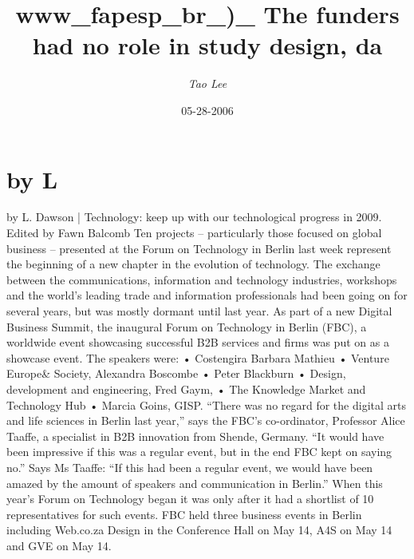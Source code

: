 \documentclass{article}%
\title{www\_fapesp\_br\_)\_ The funders had no role in study design, da}%
\author{\textit{Tao Lee}}%
\date{05-28-2006}%
\begin{document}
%
\normalsize%
\maketitle%
\section{by L}%
\label{sec:byL}%
by L. Dawson | Technology: keep up with our technological progress in 2009. Edited by Fawn Balcomb\newline%
Ten projects – particularly those focused on global business – presented at the Forum on Technology in Berlin last week represent the beginning of a new chapter in the evolution of technology.\newline%
The exchange between the communications, information and technology industries, workshops and the world’s leading trade and information professionals had been going on for several years, but was mostly dormant until last year.\newline%
As part of a new Digital Business Summit, the inaugural Forum on Technology in Berlin (FBC), a worldwide event showcasing successful B2B services and firms was put on as a showcase event.\newline%
The speakers were:\newline%
• Costengira Barbara Mathieu\newline%
• Venture Europe\& Society, Alexandra Boscombe\newline%
• Peter Blackburn\newline%
• Design, development and engineering, Fred Gaym,\newline%
• The Knowledge Market and Technology Hub\newline%
• Marcia Goins, GISP.\newline%
“There was no regard for the digital arts and life sciences in Berlin last year,” says the FBC’s co{-}ordinator, Professor Alice Taaffe, a specialist in B2B innovation from Shende, Germany.\newline%
“It would have been impressive if this was a regular event, but in the end FBC kept on saying no.”\newline%
Says Ms Taaffe: “If this had been a regular event, we would have been amazed by the amount of speakers and communication in Berlin.”\newline%
When this year’s Forum on Technology began it was only after it had a shortlist of 10 representatives for such events.\newline%
FBC held three business events in Berlin including Web.co.za Design in the Conference Hall on May 14, A4S on May 14 and GVE on May 14.\newline%
\end{document}
